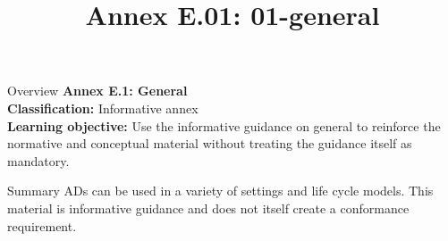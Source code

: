 \documentclass[10pt,letterpaper]{article}
\title{Annex E.01: 01-general}
\author{}
\date{}
\begin{document}
\maketitle
\begin{CornellOverviewBox}{Overview}
{\Large\bfseries\textcolor{CNavy}{Annex E.1: General}}\\[3pt]
{\small\textbf{Classification:} Informative annex}\\
{\small\textbf{Learning objective:} Use the informative guidance on general to reinforce the normative and conceptual material without treating the guidance itself as mandatory.}
\end{CornellOverviewBox}
\vspace{3pt}

\begin{CornellNotesTable}
\end{CornellNotesTable}


\begin{CornellSummaryBox}{Summary}
ADs can be used in a variety of settings and life cycle models. This material is informative guidance and does not itself create a conformance requirement.
\end{CornellSummaryBox}
\end{document}
